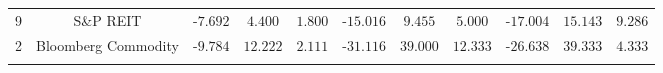 \begin{landscape}
\begin{table}[!htbp]
\begin{adjustbox}{max width=4\totalheight}
\begin{tabular}{@{\extracolsep{5pt}} Hcccccccccc}
9 & S\&P REIT & -$7.692$ & $4.400$ & $1.800$ & -$15.016$ & $9.455$ & $5.000$ & -$17.004$ & $15.143$ & $9.286$ \\ 
2 & Bloomberg Commodity & -$9.784$ & $12.222$ & $2.111$ & -$31.116$ & $39.000$ & $12.333$ & -$26.638$ & $39.333$ & $4.333$\\
\hline \\[-1.8ex] 
\end{tabular} 
\end{adjustbox}
\end{table} 
\end{landscape}